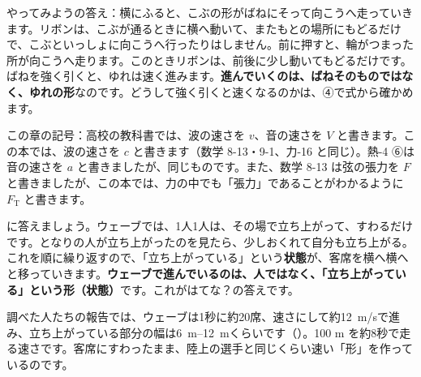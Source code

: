 \noindent やってみようの答え：横にふると、こぶの形がばねにそって向こうへ走っていきます。リボンは、こぶが通るときに横へ動いて、またもとの場所にもどるだけで、こぶといっしょに向こうへ行ったりはしません。前に押すと、輪がつまった所が向こうへ走ります。このときリボンは、前後に少し動いてもどるだけです。ばねを強く引くと、ゆれは速く進みます。\textbf{進んでいくのは、ばねそのものではなく、ゆれの形}なのです。どうして強く引くと速くなるのかは、④で式から確かめます。

\begin{omoidasou}
\end{omoidasou}

\noindent この章の記号：高校の教科書では、波の速さを $v$、音の速さを $V$ と書きます。この本では、波の速さを $c$ と書きます（数学 8-13・9-1、力-16 と同じ）。熱-4 ⑥は音の速さを $a$ と書きましたが、同じものです。また、数学 8-13 は弦の張力を $F$ と書きましたが、この本では、力の中でも「張力」であることがわかるように $F_{\mathrm T}$ と書きます。


\label{ph:波-5:sec1}
\bkhatenaref に答えましょう。ウェーブでは、1人1人は、その場で立ち上がって、すわるだけです。となりの人が立ち上がったのを見たら、少しおくれて自分も立ち上がる。これを順に繰り返すので、「立ち上がっている」という\textbf{状態}が、客席を横へ横へと移っていきます。\textbf{ウェーブで進んでいるのは、人ではなく、「立ち上がっている」という形（状態）}です。これがはてな？の答えです。

調べた人たちの報告では、ウェーブは1秒に約20席、速さにして約\qty{12}{m/s}で進み、立ち上がっている部分の幅は\qtyrange{6}{12}{m}くらいです（）。100 m を約8秒で走る速さです。客席にすわったまま、陸上の選手と同じくらい速い「形」を作っているのです。

